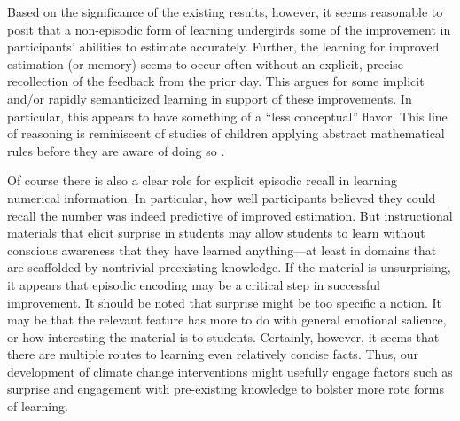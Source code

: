 Based on the significance of the existing results, however, it seems reasonable
to posit that a non-episodic form of learning undergirds some of the improvement
in participants’ abilities to estimate accurately.  Further, the learning for
improved estimation (or memory) seems to occur often without an explicit, precise
recollection of the feedback from the prior day.  This argues for some implicit
and/or rapidly semanticized learning in support of these improvements. In
particular, this appears to have something of a ``less conceptual'' flavor.
This line of reasoning is reminiscent of studies of children applying abstract
mathematical rules before they are aware of doing so
\cite{siegler_unconscious_2000}.

Of course there is also a clear role for explicit episodic recall in learning
numerical information. In particular, how well participants believed they could
recall the number was indeed predictive of improved estimation. But
instructional materials that elicit surprise in students may allow students to
learn without conscious awareness that they have learned anything---at least in
domains that are scaffolded by nontrivial preexisting knowledge. If the material
is unsurprising, it appears that episodic encoding may be a critical step in
successful improvement. It should be noted that surprise might be too specific a
notion. It may be that the relevant feature has more to do with general
emotional salience, or how interesting the material is to students. Certainly,
however, it seems that there are multiple routes to learning even relatively
concise facts. Thus, our development of climate change interventions might
usefully engage factors such as surprise and engagement with pre-existing
knowledge to bolster more rote forms of learning.



